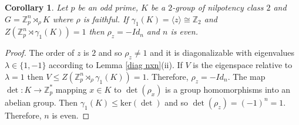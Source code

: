 \documentclass[a4paper, english, 9pt]{amsart}
\theoremstyle{plain}
\newtheorem{corollary}[theorem]{Corollary}
\theoremstyle{definition}
\def\ker#1{\mathrm{ker}(#1)}
\def\comment#1{{\color{red} #1}}
\def\Z{\mathbb Z}
\begin{document}
\begin{corollary}\label{center = -1}
Let $p$ be an odd prime, $K$ be a $2$-group of nilpotency class $2$ and $G=\Z_p^n\rtimes_\rho K$ where $\rho$ is faithful. If $\gamma_1(K)=\langle z\rangle \cong \Z_2$ and $Z(\Z_p^n\rtimes \gamma_1(K))= 1$ then $\rho_z=-Id_n$ and $n$ is even.    
\end{corollary}


\begin{proof}
The order of $z$ is $2$ and so $\rho_z\neq 1$ and it is diagonalizable with eigenvalues $\lambda\in \{1,-1\}$ according to Lemma \ref{diag nxn}(ii). If $V$ is the eigenspace relative to $\lambda=1$ then $V\leq Z(\Z_p^n\rtimes_\rho \gamma_1(K))=1$. Therefore, $\rho_z=-Id_n$. The map $\det:K\longrightarrow \Z_p^*$ mapping $x\in K$ to $\det(\rho_x)$ is a group homomorphisms into an abelian group. Then $\gamma_1(K)\leq \ker{\det}$ and so $\det(\rho_z)=(-1)^n=1$. Therefore, $n$ is even.
\end{proof}









\end{document}
